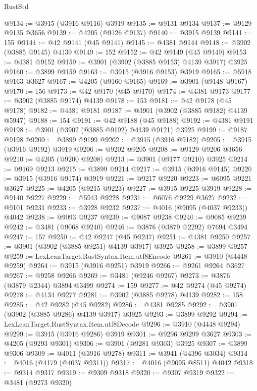 \begin{lexlean}{RustStd}
\begin{coremodule}
@9134 := @3915 (@3916 @9116) @3919
@9135 := @9131 @9134
@9137 := @9129 @9135 @3656
@9139 := @4205 (@9126 @9137)
@9140 := @3915 @9139
@9141 := 155
@9144 := @42 @9141 (@45 @9141)
@9145 := @4381 @9144
@9148 := @3902 (@3885 @9145) @4139
@9149 := 152
@9152 := @42 @9149 (@45 @9149)
@9153 := @4381 @9152
@9159 := @3901 (@3902 (@3885 @9153) @4139 @3917) @3925
@9160 := @3899 @9159
@9163 := @3915 (@3916 @9153) @3919
@9165 := @5918 @9163 @3627
@9167 := @4205 (@9160 @9165)
@9169 := @3901 (@9148 @9167)
@9170 := 156
@9173 := @42 @9170 (@45 @9170)
@9174 := @4381 @9173
@9177 := @3902 (@3885 @9174) @4139
@9178 := 153
@9181 := @42 @9178 (@45 @9178)
@9182 := @4381 @9181
@9187 := @3901 (@3902 (@3885 @9182) @4139 @5947)
@9188 := 154
@9191 := @42 @9188 (@45 @9188)
@9192 := @4381 @9191
@9198 := @3901 (@3902 (@3885 @9192) @4139 @9121) @3925
@9199 := @9187 @9198
@9200 := @3899 @9199
@9202 := @3915 (@3916 @9182)
@9205 := @3915 (@3916 @9192) @3919
@9206 := @9202 @9205
@9208 := @9129 @9206 @3656
@9210 := @4205 (@9200 @9208)
@9213 := @3901 (@9177 @9210) @3925
@9214 := @9169 @9213
@9215 := @3899 @9214
@9217 := @3915 (@3916 @9145)
@9220 := @3915 (@3916 @9174) @3919
@9221 := @9217 @9220
@9223 := @6095 @9221 @3627
@9225 := @4205 (@9215 @9223)
@9227 := @3915 @9225 @3919
@9228 := @9140 @9227
@9229 := @5943 @9228
@9231 := @6076 @9229 @3627
@9232 := @9101 @9231
@9233 := @3928 @9232
@9237 := @4016 (@9095 (@4037 @9233)) @4042
@9238 := @9093 @9237
@9239 := @9087 @9238
@9240 := @9085 @9239
@9242 := @3481 (@9068 @9240)
@9246 := @3876 (@3879 @2292) @7694 @3494
@9247 := 157
@9250 := @42 @9247 (@45 @9247)
@9251 := @4381 @9250
@9257 := @3901 (@3902 (@3885 @9251) @4139 @3917) @3925
@9258 := @3899 @9257
@9259 := LexLeanTarget.RustSyntax.Item.utf8Encode
@9261 := @3910 (@4448 @9259)
@9264 := @3915 (@3916 @9251) @3919
@9266 := @9261 @9264 @3627
@9267 := @9258 @9266
@9269 := @3481 (@9246 @9267)
@9273 := @3876 (@3879 @2344) @3894 @3499
@9274 := 159
@9277 := @42 @9274 (@45 @9274)
@9278 := @4134 @9277
@9281 := @3902 (@3885 @9278) @4139
@9282 := 158
@9285 := @42 @9282 (@45 @9282)
@9286 := @4381 @9285
@9292 := @3901 (@3902 (@3885 @9286) @4139 @3917) @3925
@9293 := @3899 @9292
@9294 := LexLeanTarget.RustSyntax.Item.utf8Decode
@9296 := @3910 (@4448 @9294)
@9299 := @3915 (@3916 @9286) @3919
@9301 := @9296 @9299 @3627
@9303 := @4205 (@9293 @9301)
@9306 := @3901 (@9281 @9303) @3925
@9307 := @3899 @9306
@9309 := @4011 (@3916 @9278)
@9311 := @3941 (@4396 @3034)
@9314 := @4016 (@4179 (@4037 @9311))
@9317 := @4016 (@9095 @8511) @4042
@9318 := @9314 @9317
@9319 := @9309 @9318
@9320 := @9307 @9319
@9322 := @3481 (@9273 @9320)

\end{coremodule}
\end{lexlean}
